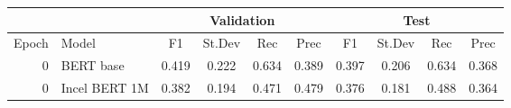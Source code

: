 \begin{tabular}{rl|cccc|cccc}
\hline
                  &                    &  \multicolumn{4}{c|}{Validation}              & \multicolumn{4}{c}{Test} \\
\hline
            Epoch &              Model &      F1 &      St.Dev &   Rec & Prec &       F1 &       St.Dev &  Rec   &  Prec \\
\hline
                0 &     BERT base &   0.419 &          0.222 &    0.634 &     0.389 &    0.397 &           0.206 &     0.634 &      0.368 \\
                0 & Incel BERT 1M &   0.382 &          0.194 &    0.471 &     0.479 &    0.376 &           0.181 &     0.488 &      0.364 \\
\hline
\end{tabular}
